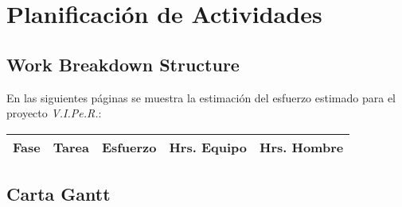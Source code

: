 \appendix
\chapter{Planificaci\'on de Actividades}
\newpage
\section[WBS]{Work Breakdown Structure}
En las siguientes p\'aginas se muestra la estimaci\'on del esfuerzo estimado para el proyecto \emph{V.I.Pe.R.}:

\begin{table}[H]
  \centering
  \begin{tabular}{|l|m{5cm}|l|l|l|}\hline
    {\bf Fase} & {\bf Tarea} & {\bf Esfuerzo} & {\bf Hrs. Equipo} & {\bf Hrs. Hombre}\\\hline
  \end{tabular}
\end{table}
\newpage
\section{Carta Gantt}

